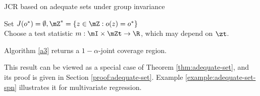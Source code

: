 \documentclass[english]{article}
\begin{document}
 
\begin{algorithm}%
\caption{JCR based on adequate sets under group invariance}
\label{a3}
{}
Set $J(o^*) = \emptyset, \mZ^* = \{z \in \mZ: o(z) = o^*\}$\\
Choose a test statistic $m: \mI \times \mZt \to \R$, which may depend on  $\zt$.\\
\end{algorithm}

\begin{theorem}
 Algorithm \ref{a3} returns a 
$1 - \alpha$-joint coverage region. 
\end{theorem}

This result can be viewed as a special case of Theorem \ref{thm:adequate-set}, and its proof is given in Section \ref{proof:adequate-set}.
Example \ref{example:adequate-set-spn} illustrates it for multivariate regression.
\end{document}
